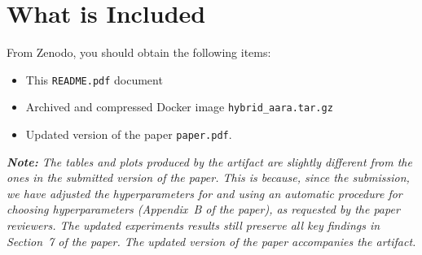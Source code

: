 
\section{What is Included}

From Zenodo, you should obtain the following items:
\begin{itemize}
  \item This \texttt{README.pdf} document
  \item Archived and compressed Docker image \texttt{hybrid\_aara.tar.gz}
  \item Updated version of the paper \texttt{paper.pdf}.
\end{itemize}

\emph{\textbf{Note:} The tables and plots produced by the artifact are slightly
  different from the ones in the submitted version of the paper.
  This is because, since the submission, we have adjusted the hyperparameters
  for \BayesWC{} and \BayesPC{} using an automatic procedure for choosing
  hyperparameters (Appendix~B of the paper), as requested by the paper
  reviewers.
  The updated experiments results still preserve all key findings in Section~7
  of the paper.
  The updated version of the paper accompanies the artifact.}


